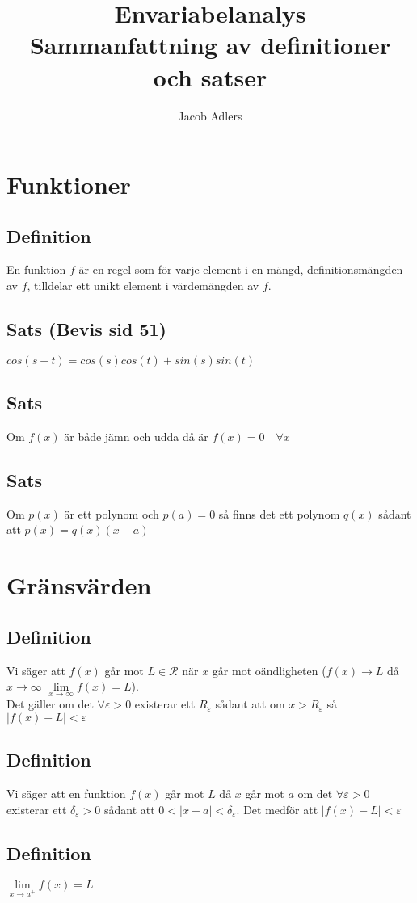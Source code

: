\documentclass{article}
\title{Envariabelanalys\\Sammanfattning av definitioner och satser}
\author{Jacob Adlers}
\begin{document}
\maketitle
\newpage

\section{Funktioner}
\subsection{Definition}
En funktion $f$ är en regel som för varje element i en mängd, definitionsmängden av $f$, tilldelar ett unikt element i värdemängden av $f$.

\subsection{Sats (Bevis sid 51)}
$cos(s-t)=cos(s)cos(t)+sin(s)sin(t)$

\subsection{Sats}
Om $f(x)$ är både jämn och udda då är $f(x)=0 \quad \forall x $

\subsection{Sats}
Om $p(x)$ är ett polynom och $p(a)=0$ så finns det ett polynom $q(x)$ sådant att $p(x)=q(x)(x-a)$

\section{Gränsvärden}
\subsection{Definition}
Vi säger att $f(x)$ går mot $L\in \mathcal{R}$ när $x$ går mot oändligheten ($f(x) \to L$ då $x \rightarrow \infty$ $\lim\limits_{x \to\infty} f(x)=L$).\\
Det gäller om det $\forall\varepsilon>0$ existerar ett $R_{\varepsilon}$ sådant att om $x>R_{\varepsilon}$ så $|f(x)-L|<\varepsilon$

\subsection{Definition}
Vi säger att en funktion $f(x)$ går mot $L$ då $x$ går mot $a$ om det $\forall\varepsilon>0$ existerar ett $\delta_{\varepsilon}>0$ sådant att $0<|x-a|<\delta_{\varepsilon}$. Det medför att $|f(x)-L|<\varepsilon$

\subsection{Definition}
$\lim\limits_{x\to a^{+}} f(x) = L$
\end{document}
